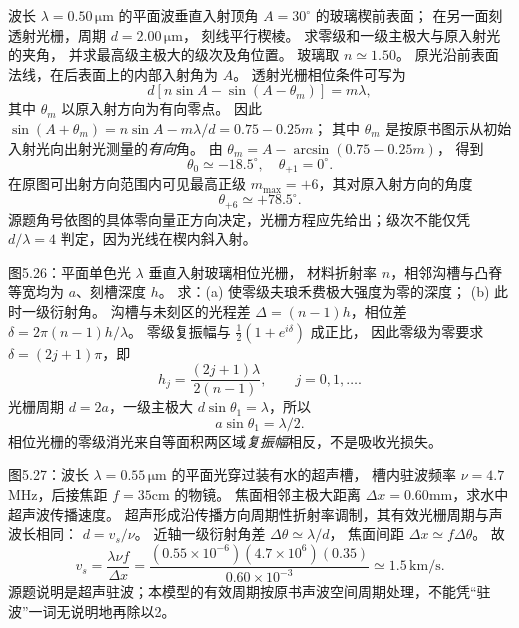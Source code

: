 波长 $\lambda=0.50\,\mathrm{\mu m}$ 的平面波垂直入射顶角
$A=30^\circ$ 的玻璃楔前表面；
在另一面刻透射光栅，周期
$d=2.00\,\mathrm{\mu m}$，
刻线平行楔棱。
求零级和一级主极大与原入射光的夹角，
并求最高级主极大的级次及角位置。
\exsolution
玻璃取 $n\simeq1.50$。
原光沿前表面法线，在后表面上的内部入射角为 $A$。
透射光栅相位条件可写为
\[
d[n\sin A-\sin(A-\theta_m)]=m\lambda,
\]
其中 $\theta_m$ 以原入射方向为有向零点。
因此
$\sin(A+\theta_m)=n\sin A-m\lambda/d
=0.75-0.25m$；
其中 $\theta_m$ 是按原书图示从初始入射光向出射光测量的\emph{有向}角。
由
$\theta_m=A-\arcsin(0.75-0.25m)$，
得到
\[
\boxed{\theta_0\simeq-18.5^\circ},\quad
\boxed{\theta_{+1}=0^\circ}.
\]
在原图可出射方向范围内可见最高正级
$\boxed{m_{\max}=+6}$，其对原入射方向的角度
\[
\boxed{\theta_{+6}\simeq+78.5^\circ}.
\]
\excheck 源题角号依图的具体零向量正方向决定，光栅方程应先给出；级次不能仅凭 $d/\lambda=4$ 判定，因为光线在楔内斜入射。

图5.26：平面单色光 $\lambda$ 垂直入射玻璃相位光栅，
材料折射率 $n$，相邻沟槽与凸脊等宽均为 $a$、刻槽深度 $h$。
求：(a) 使零级夫琅禾费极大强度为零的深度；
(b) 此时一级衍射角。
\exsolution
沟槽与未刻区的光程差
$\Delta=(n-1)h$，相位差
$\delta=2\pi(n-1)h/\lambda$。
零级复振幅与
$\tfrac12(1+e^{i\delta})$ 成正比，
因此零级为零要求
$\delta=(2j+1)\pi$，即
\[
\boxed{h_j=\frac{(2j+1)\lambda}{2(n-1)}},\qquad j=0,1,\ldots.
\]
光栅周期 $d=2a$，一级主极大
$d\sin\theta_1=\lambda$，所以
\[
\boxed{a\sin\theta_1=\lambda/2}.
\]
\excheck 相位光栅的零级消光来自等面积两区域\emph{复振幅}相反，不是吸收光损失。

图5.27：波长
$\lambda=0.55\,\mathrm{\mu m}$ 的平面光穿过装有水的超声槽，
槽内驻波频率
$\nu=4.7$MHz，后接焦距
$f=35$cm 的物镜。
焦面相邻主极大距离
$\Delta x=0.60$mm，求水中超声波传播速度。
\exsolution
超声形成沿传播方向周期性折射率调制，其有效光栅周期与声波长相同：
$d=v_s/\nu$。
近轴一级衍射角差
$\Delta\theta\simeq\lambda/d$，
焦面间距
$\Delta x\simeq f\Delta\theta$。
故
\[
\boxed{v_s=\frac{\lambda\nu f}{\Delta x}}
=\frac{(0.55\times10^{-6})(4.7\times10^6)(0.35)}
{0.60\times10^{-3}}
\simeq1.5\,\mathrm{km/s}.
\]
\excheck 源题说明是超声驻波；本模型的有效周期按原书声波空间周期处理，不能凭“驻波”一词无说明地再除以2。


